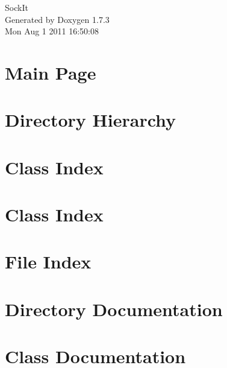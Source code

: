 \documentclass[a4paper]{book}
\begin{document}
\hypersetup{pageanchor=false}
\begin{titlepage}
\vspace*{7cm}
\begin{center}
{\Large SockIt }\\
\vspace*{1cm}
{\large Generated by Doxygen 1.7.3}\\
\vspace*{0.5cm}
{\small Mon Aug 1 2011 16:50:08}\\
\end{center}
\end{titlepage}
\clearemptydoublepage
{}
\tableofcontents
\clearemptydoublepage
{}
\hypersetup{pageanchor=true}
\chapter{Main Page}
\label{index}\hypertarget{index}{}
\chapter{Directory Hierarchy}

\chapter{Class Index}

\chapter{Class Index}

\chapter{File Index}

\chapter{Directory Documentation}







\chapter{Class Documentation}

















\end{document}
